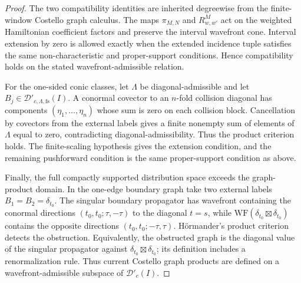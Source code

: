 \begin{proof}
  The two compatibility identities are inherited degreewise from the
  finite-window Costello graph calculus.  The maps \(\pi_{M,N}\) and
  \(R^M_{w,w'}\) act on the weighted Hamiltonian coefficient factors and
  preserve the interval wavefront cone.  Interval extension by zero
  is allowed exactly when the extended incidence tuple satisfies the same
  non-characteristic and proper-support conditions.  Hence compatibility
  holds on the stated wavefront-admissible relation.

  For the one-sided conic classes, let
  \(\Lambda\) be diagonal-admissible and let
  \(B_j\in\mathcal D'_{c,\Lambda,\mathrm{fs}}(I)\).  A conormal covector
  to an \(n\)-fold collision diagonal has components
  \((\eta_1,\ldots,\eta_n)\) whose sum is zero on each collision block.
  Cancellation by covectors from the external labels gives a finite
  nonempty sum of elements of \(\Lambda\) equal to zero, contradicting
  diagonal-admissibility.  Thus the product criterion holds.
  The finite-scaling hypothesis gives the extension condition, and the
  remaining pushforward condition is the same proper-support condition as
  above.

  Finally, the full compactly supported distribution space exceeds the
  graph-product domain.
  In the one-edge boundary graph take two external labels
  \(B_1=B_2=\delta_{t_0}\).  The singular boundary propagator has
  wavefront containing the conormal directions
  \((t_0,t_0;\tau,-\tau)\) to the diagonal \(t=s\), while
  \(\mathrm{WF}(\delta_{t_0}\boxtimes\delta_{t_0})\) contains the
  opposite directions \((t_0,t_0;-\tau,\tau)\).  H\"ormander's product
  criterion detects the obstruction.  Equivalently, the obstructed graph is the
  diagonal value of the singular propagator against
  \(\delta_{t_0}\boxtimes\delta_{t_0}\); its definition includes a
  renormalization rule.  Thus current Costello graph products are
  defined on a wavefront-admissible subspace of \(\mathcal D'_c(I)\).
\end{proof}

